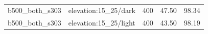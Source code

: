 \begin{longtable}{l>{\raggedright\arraybackslash}p{.42\linewidth}rrr}
b500\_\allowbreak{}both\_\allowbreak{}s303 & %
elevation:15\_\allowbreak{}25/dark & %
400 & %
47.50 & %
98.34 \\ %

b500\_\allowbreak{}both\_\allowbreak{}s303 & %
elevation:15\_\allowbreak{}25/light & %
400 & %
43.50 & %
98.19 \\ %


\end{longtable}
